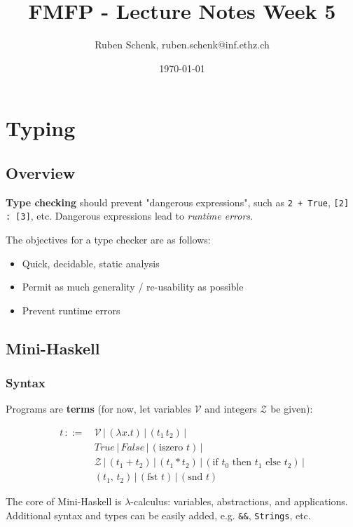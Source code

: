 \documentclass[a4paper]{extarticle}
\title{FMFP - Lecture Notes Week 5}
\author{Ruben Schenk, ruben.schenk@inf.ethz.ch}
\date{\today}
\begin{document}
\maketitle
\newpage

\section{Typing}

\subsection{Overview}

\textbf{Type checking} should prevent "dangerous expressions", such as \verb|2 + True|, \verb|[2] : [3]|, etc. Dangerous expressions lead to \textit{runtime errors.}

The objectives for a type checker are as follows:

\begin{itemize}
    \item Quick, decidable, static analysis
    \item Permit as much generality / re-usability as possible
    \item Prevent runtime errors
\end{itemize}

\subsection{Mini-Haskell}

\subsubsection{Syntax}

Programs are \textbf{terms} (for now, let variables \(\mathcal{V}\) and integers \(\mathcal{Z}\) be given):

\begin{align*}
    t \, ::= \, &\mathcal{V} \, | \, (\lambda x.t) \, | \, (t_1 \, t_2) \, | \\
    &True \, | \, False \, | \, (\text{iszero } t) \, | \\
    & \mathcal{Z} \, | \, (t_1 + t_2) \, | \, (t_1 * t_2) \, | \, (\text{if } t_0 \text{ then } t_1 \text{ else } t_2) \, | \\
    &(t_1, \, t_2) \, | \, (\text{fst } t) \, | \, (\text{snd } t)
\end{align*}

The core of Mini-Haskell is \(\lambda\)-calculus: variables, abstractions, and applications. Additional syntax and types can be easily added, e.g. \verb|&&|, \verb|Strings|, etc.
\end{document}
